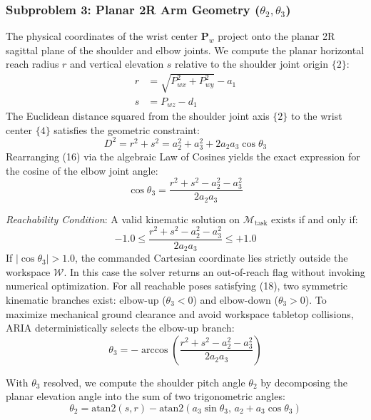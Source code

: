 \documentclass[journal]{IEEEtran}
\begin{document}
\subsubsection{Subproblem 3: Planar 2R Arm Geometry ($\theta_2, \theta_3$)}
The physical coordinates of the wrist center $\mathbf{P}_w$ project onto the planar 2R sagittal plane of the shoulder and elbow joints. We compute the planar horizontal reach radius $r$ and vertical elevation $s$ relative to the shoulder joint origin $\{2\}$:
\begin{align}
r &= \sqrt{P_{wx}^2 + P_{wy}^2} - a_1 \\
s &= P_{wz} - d_1
\end{align}
The Euclidean distance squared from the shoulder joint axis $\{2\}$ to the wrist center $\{4\}$ satisfies the geometric constraint:
\begin{equation}
D^2 = r^2 + s^2 = a_2^2 + a_3^2 + 2 a_2 a_3 \cos\theta_3
\end{equation}
Rearranging (16) via the algebraic Law of Cosines yields the exact expression for the cosine of the elbow joint angle:
\begin{equation}
\cos\theta_3 = \frac{r^2 + s^2 - a_2^2 - a_3^2}{2 a_2 a_3}
\end{equation}

\textit{Reachability Condition}: A valid kinematic solution on $\mathcal{M}_{\text{task}}$ exists if and only if:
\begin{equation}
-1.0 \le \frac{r^2 + s^2 - a_2^2 - a_3^2}{2 a_2 a_3} \le +1.0
\end{equation}
If $|\cos\theta_3| > 1.0$, the commanded Cartesian coordinate lies strictly outside the workspace $\mathcal{W}$. In this case the solver returns an out-of-reach flag without invoking numerical optimization. For all reachable poses satisfying (18), two symmetric kinematic branches exist: elbow-up ($\theta_3 < 0$) and elbow-down ($\theta_3 > 0$). To maximize mechanical ground clearance and avoid workspace tabletop collisions, ARIA deterministically selects the elbow-up branch:
\begin{equation}
\theta_3 = -\arccos\left( \frac{r^2 + s^2 - a_2^2 - a_3^2}{2 a_2 a_3} \right)
\end{equation}

With $\theta_3$ resolved, we compute the shoulder pitch angle $\theta_2$ by decomposing the planar elevation angle into the sum of two trigonometric angles:
\begin{equation}
\theta_2 = \text{atan2}(s, r) - \text{atan2}\left(a_3 \sin\theta_3, \, a_2 + a_3 \cos\theta_3\right)
\end{equation}
\end{document}

